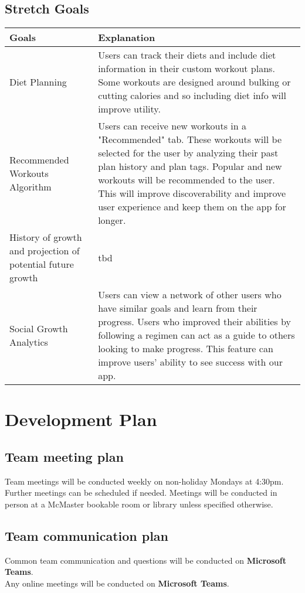 \documentclass{article}
\begin{document}
\subsection{Stretch Goals}

\begin{tabular}{ |p{5cm}|p{8cm}| }
	\hline
	Goals & Explanation \\
	\hline
	Diet Planning & Users can track their diets and include diet information in their custom workout plans. Some workouts are
	designed around bulking or cutting calories and so including diet info will improve utility. \\
	\hline
	Recommended Workouts Algorithm & Users can receive new workouts in a "Recommended" tab. These workouts will be selected for the user by analyzing
	their past plan history and plan tags. Popular and new workouts will be recommended to the user. This will improve discoverability and improve
	 user experience and keep them on the app for longer.  \\
	\hline
	History of growth and projection of potential future growth & tbd \\
	\hline
	Social Growth Analytics & Users can view a network of other users who have similar goals and learn from their progress.
	Users who improved their abilities by following a regimen can act as a guide to others looking to make progress. This feature can improve
	users' ability to see success with our app. \\
	\hline
\end{tabular}

\section {Development Plan}

\subsection{Team meeting plan}
Team meetings will be conducted weekly on non-holiday Mondays at 4:30pm.
Further meetings can be scheduled if needed.
Meetings will be conducted in person at a McMaster bookable room or library unless specified otherwise.

\subsection{Team communication plan}
Common team communication and questions will be conducted on \textbf{Microsoft Teams}.\\
Any online meetings will be conducted on \textbf{Microsoft Teams}. \\
\end{document}
